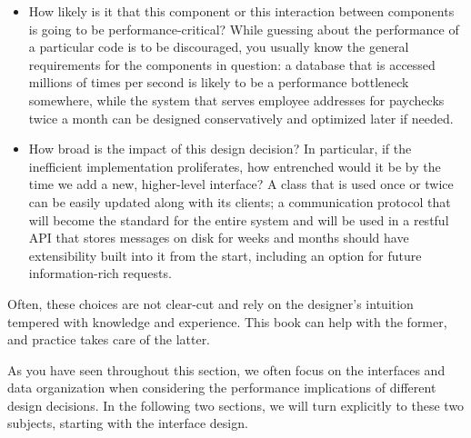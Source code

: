 \begin{itemize}
\item 
How likely is it that this component or this interaction between components is going to be performance-critical? While guessing about the performance of a particular code is to be discouraged, you usually know the general requirements for the components in question: a database that is accessed millions of times per second is likely to be a performance bottleneck somewhere, while the system that serves employee addresses for paychecks twice a month can be designed conservatively and optimized later if needed.

\item 
How broad is the impact of this design decision? In particular, if the inefficient implementation proliferates, how entrenched would it be by the time we add a new, higher-level interface? A class that is used once or twice can be easily updated along with its clients; a communication protocol that will become the standard for the entire system and will be used in a restful API that stores messages on disk for weeks and months should have extensibility built into it from the start, including an option for future information-rich requests.
\end{itemize}

Often, these choices are not clear-cut and rely on the designer's intuition tempered with knowledge and experience. This book can help with the former, and practice takes care of the latter. 

As you have seen throughout this section, we often focus on the interfaces and data organization when considering the performance implications of different design decisions. In the following two sections, we will turn explicitly to these two subjects, starting with the interface design.








